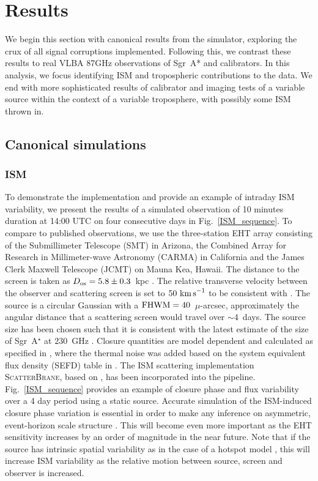 \chapter{Results}
We begin this section with canonical results from the simulator, exploring the crux of all signal corruptions implemented. Following this, we contrast these results to real VLBA 87GHz observations of Sgr~A* and calibrators. In this analysis, we focus identifying ISM and tropospheric contributions to the data. We end with more sophisticated results of calibrator and imaging tests of a variable source within the context of a variable troposphere, with possibly some ISM thrown in.



\section{Canonical simulations}\label{sec:can_sim}


\subsection{ISM}

To demonstrate the implementation and provide an example of intraday ISM variability, we present the results of a simulated observation of 10 minutes duration at 14:00 UTC on four consecutive days in Fig.~\ref{ISM_sequence}. To compare to published observations, we use the three-station EHT array consisting of the Submillimeter Telescope (SMT) in Arizona, the Combined Array for Research in Millimeter-wave Astronomy (CARMA) in California and the James Clerk Maxwell Telescope (JCMT) on Mauna Kea, Hawaii. The distance to the screen is taken as $D_{\rm os}=5.8 \pm 0.3$~kpc  \citep{Bower_2014}. The relative transverse velocity between the observer and scattering screen is set to $50~\rm{km\,s}^{-1}$ to be consistent with \citet{2016arXiv160106571O}. The source is a circular Gaussian with a $\rm{FHWM}=40$~$\mu$-arcsec, approximately the angular distance that a scattering screen would travel over $\sim 4$~days. The source size has been chosen such that it is consistent with the latest estimate of the size of Sgr~A$^\star$ at $230$~GHz \citep{Fish_2011}.  Closure quantities are model dependent and calculated as specified in \citet{Rogers_1995}, where the thermal noise was added based on the system equivalent flux density (SEFD) table in \citep{Lu_2014}. 
The ISM scattering implementation \textsc{ScatterBrane}, based on \citet*{Johnson_2015a}, has been incorporated into the pipeline. Fig.~\ref{ISM_sequence} provides an example of closure phase and flux variability over a 4 day period using a static source. Accurate simulation of the ISM-induced closure phase variation is essential in order to make any inference on asymmetric, event-horizon scale structure \citep[e.g.][]{Fish_2016,2016arXiv160106571O}. This will become even more important as the EHT sensitivity increases by an order of magnitude in the near future. Note that if the source has intrinsic spatial variability as in the case of a hotspot model \cite{Doeleman_2009}, this will increase ISM variability as the relative motion between source, screen and observer is increased. 

